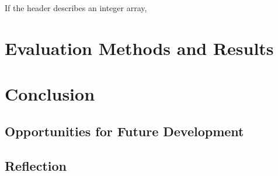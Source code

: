		If the header describes an integer array, 

\chapter{Evaluation Methods and Results}

\chapter{Conclusion}
	
	\section{Opportunities for Future Development}
	
	\section{Reflection}

\bibliographysection

